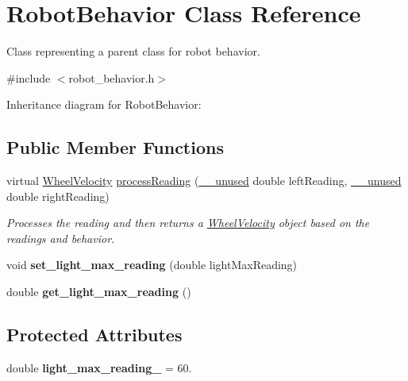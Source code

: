 \hypertarget{classRobotBehavior}{}\section{Robot\+Behavior Class Reference}
\label{classRobotBehavior}


Class representing a parent class for robot behavior.  




{\ttfamily \#include $<$robot\+\_\+behavior.\+h$>$}



Inheritance diagram for Robot\+Behavior\+:
\subsection*{Public Member Functions}
\begin{DoxyCompactItemize}
\item 
virtual \hyperlink{structWheelVelocity}{Wheel\+Velocity} \hyperlink{classRobotBehavior_a4236ef7b0af775296b8acd33de7198d2}{process\+Reading} (\hyperlink{common_8h_a2e3484535ee610c8e19e9859563abe48}{\+\_\+\+\_\+unused} double left\+Reading, \hyperlink{common_8h_a2e3484535ee610c8e19e9859563abe48}{\+\_\+\+\_\+unused} double right\+Reading)
\begin{DoxyCompactList}\small\item\em Processes the reading and then returns a \hyperlink{structWheelVelocity}{Wheel\+Velocity} object based on the readings and behavior. \end{DoxyCompactList}\item 
void {\bfseries set\+\_\+light\+\_\+max\+\_\+reading} (double light\+Max\+Reading)\hypertarget{classRobotBehavior_a830ad34642e167aa7bdcf16d8bd5adb3}{}\label{classRobotBehavior_a830ad34642e167aa7bdcf16d8bd5adb3}

\item 
double {\bfseries get\+\_\+light\+\_\+max\+\_\+reading} ()\hypertarget{classRobotBehavior_ac5231ab13c2a70da08de0fc714009014}{}\label{classRobotBehavior_ac5231ab13c2a70da08de0fc714009014}

\end{DoxyCompactItemize}
\subsection*{Protected Attributes}
\begin{DoxyCompactItemize}
\item 
double {\bfseries light\+\_\+max\+\_\+reading\+\_\+} = 60.\hypertarget{classRobotBehavior_aeb06a328f9a21a93ebd3dba5d60ff2aa}{}\label{classRobotBehavior_aeb06a328f9a21a93ebd3dba5d60ff2aa}

\end{DoxyCompactItemize}


